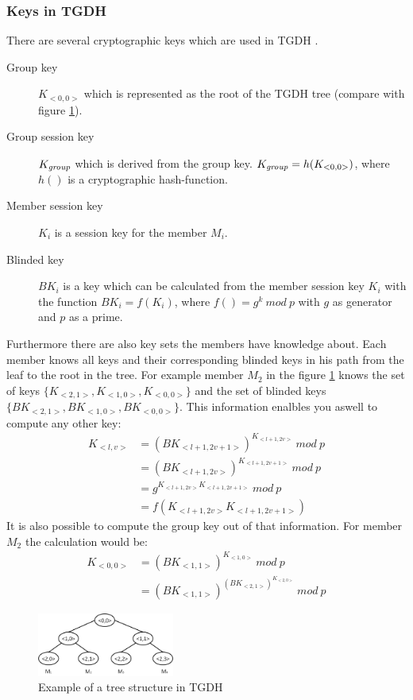 \subsubsection{Keys in TGDH}
There are several cryptographic keys which are used in TGDH \cite{Liao2004}.
\begin{description}
\item[Group key] $K_{<0,0>}$ which is represented as the root of the TGDH tree (compare with figure \ref{fig:tgdh_tree}).
\item[Group session key] $K_{\text{\textit{group}}}$ which is derived from the group key. $K_{\text{\textit{group}}} = h(K_{<0,0>})$, where $h()$ is a cryptographic hash-function.
\item[Member session key] $K_i$ is a session key for the member $M_i$. 
\item[Blinded key] $BK_i$ is a key which can be calculated from the member session key $K_i$ with the function $BK_i = f(K_i)$, where $f() = g^k~mod~p$ with $g$ as generator and $p$ as a prime.
\end{description}
Furthermore there are also key sets the members have knowledge about. Each member knows all keys and their corresponding blinded keys in his path from the leaf to the root in the tree. For example member $M_2$ in the figure \ref{fig:tgdh_tree} knows the set of keys $\{K_{<2,1>}, K_{<1,0>}, K_{<0,0>}\}$ and the set of blinded keys $\{BK_{<2,1>}, BK_{<1,0>}, BK_{<0,0>}\}$. This information enalbles you aswell to compute any other key:
\begin{align*}
K_{<l,v>} &= (BK_{<l+1, 2v+1>})^{K_{<l+1, 2v>}}~mod~p\\
&= (BK_{<l+1, 2v>})^{K_{<l+1, 2v+1>}}~mod~p\\
&= g^{K_{<l+1, 2v>}K_{<l+1, 2v+1>}}~mod~p\\
&= f(K_{<l+1, 2v>}K_{<l+1, 2v+1>})
\end{align*}
It is also possible to compute the group key out of that information. For member $M_2$ the calculation would be:
\begin{align*}
K_{<0,0>} &= (BK_{<1,1>})^{K_{<1,0>}}~mod~p\\
&= (BK_{<1,1>})^{(BK_{<2,1>})^{K_{<2,0>}}}~mod~p
\end{align*}
\begin{figure}[!h]
\centering\includegraphics[width=0.4\textwidth]{Images/tgdh_tree}
\caption{Example of a tree structure in TGDH}
\label{fig:tgdh_tree}
\end{figure}

